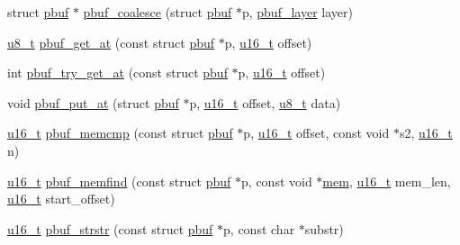 \begin{DoxyCompactItemize}
struct \hyperlink{structpbuf}{pbuf} $\ast$ \hyperlink{group__pbuf_ga031469589fa95ece3bf1c136d1509eac}{pbuf\+\_\+coalesce} (struct \hyperlink{structpbuf}{pbuf} $\ast$p, \hyperlink{group__pbuf_gaee1baa59bb2f85ba575b5a8619ac1ebf}{pbuf\+\_\+layer} layer)
\item 
\hyperlink{group__compiler__abstraction_ga4caecabca98b43919dd11be1c0d4cd8e}{u8\+\_\+t} \hyperlink{group__pbuf_ga6d803d9945bffb7ad97743f2fa503da6}{pbuf\+\_\+get\+\_\+at} (const struct \hyperlink{structpbuf}{pbuf} $\ast$p, \hyperlink{group__compiler__abstraction_ga77570ac4fcab86864fa1916e55676da2}{u16\+\_\+t} offset)
\item 
int \hyperlink{group__pbuf_ga839f342803b0cf89049744124c5a98ad}{pbuf\+\_\+try\+\_\+get\+\_\+at} (const struct \hyperlink{structpbuf}{pbuf} $\ast$p, \hyperlink{group__compiler__abstraction_ga77570ac4fcab86864fa1916e55676da2}{u16\+\_\+t} offset)
\item 
void \hyperlink{group__pbuf_gaf76863707dc02993eae116574b1ea03f}{pbuf\+\_\+put\+\_\+at} (struct \hyperlink{structpbuf}{pbuf} $\ast$p, \hyperlink{group__compiler__abstraction_ga77570ac4fcab86864fa1916e55676da2}{u16\+\_\+t} offset, \hyperlink{group__compiler__abstraction_ga4caecabca98b43919dd11be1c0d4cd8e}{u8\+\_\+t} data)
\item 
\hyperlink{group__compiler__abstraction_ga77570ac4fcab86864fa1916e55676da2}{u16\+\_\+t} \hyperlink{group__pbuf_ga2170ccbbb13238380dbb203ee1b85974}{pbuf\+\_\+memcmp} (const struct \hyperlink{structpbuf}{pbuf} $\ast$p, \hyperlink{group__compiler__abstraction_ga77570ac4fcab86864fa1916e55676da2}{u16\+\_\+t} offset, const void $\ast$s2, \hyperlink{group__compiler__abstraction_ga77570ac4fcab86864fa1916e55676da2}{u16\+\_\+t} n)
\item 
\hyperlink{group__compiler__abstraction_ga77570ac4fcab86864fa1916e55676da2}{u16\+\_\+t} \hyperlink{group__pbuf_ga18c164a6e4a24d89ea9eb7571a886448}{pbuf\+\_\+memfind} (const struct \hyperlink{structpbuf}{pbuf} $\ast$p, const void $\ast$\hyperlink{structmem}{mem}, \hyperlink{group__compiler__abstraction_ga77570ac4fcab86864fa1916e55676da2}{u16\+\_\+t} mem\+\_\+len, \hyperlink{group__compiler__abstraction_ga77570ac4fcab86864fa1916e55676da2}{u16\+\_\+t} start\+\_\+offset)
\item 
\hyperlink{group__compiler__abstraction_ga77570ac4fcab86864fa1916e55676da2}{u16\+\_\+t} \hyperlink{openmote-cc2538_2lwip_2src_2core_2pbuf_8c_a9ba3f7b705309ceadb147692fd5a1c7d}{pbuf\+\_\+strstr} (const struct \hyperlink{structpbuf}{pbuf} $\ast$p, const char $\ast$substr)
\end{DoxyCompactItemize}


